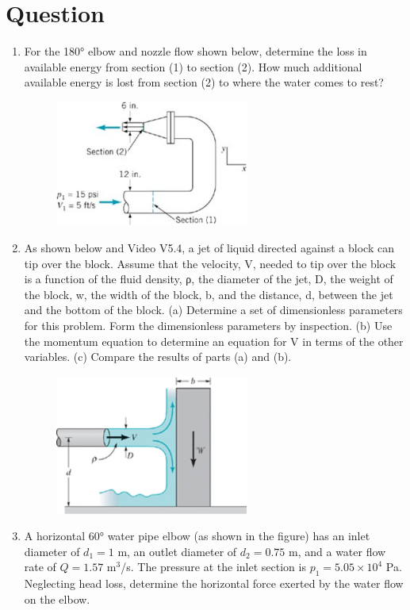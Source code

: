 \documentclass[12pt,a4paper]{article}
\newcounter{question}
\newenvironment{questions}{
    \setcounter{question}{0}
    \section*{Question}
    \begin{enumerate}[leftmargin=1.5em,label={\arabic*．}]
}{
    \end{enumerate}
}
\begin{document}
\begin{questions}
\item For the 180° elbow and nozzle flow shown below, determine the loss in available energy from section (1) to section (2). How much additional available energy is lost from section (2) to where the water comes to rest?

\begin{figure}[H]
\centering
\includegraphics[width=0.6\textwidth]{./figures/20.png}
\end{figure}

\item  As shown below and Video V5.4, a jet of liquid directed against a block can tip over the block. Assume that the velocity, V, needed to tip over the block is a function of the fluid density, ρ, the diameter of the jet, D, the weight of the block, w, the width of the block, b, and the distance, d, between the jet and the bottom of the block. (a) Determine a set of dimensionless parameters for this problem. Form the dimensionless parameters by inspection. (b) Use the momentum equation to determine an equation for V in terms of the other variables. (c) Compare the results of parts (a) and (b). 

\begin{figure}[H]
\centering
\includegraphics[width=0.6\textwidth]{./figures/21.png}
\end{figure}

\item A horizontal 60° water pipe elbow (as shown in the figure) has an inlet diameter of \(d_1 = 1\) m, an outlet diameter of \(d_2 = 0.75\) m, and a water flow rate of \(Q = 1.57\) m\(^3\)/s. The pressure at the inlet section is \(p_1 = 5.05 \times 10^4\) Pa. Neglecting head loss, determine the horizontal force exerted by the water flow on the elbow.


\end{questions}
\end{document}
